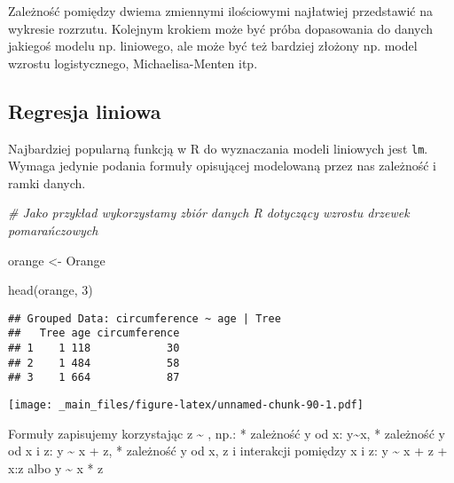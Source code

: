 \documentclass[
]{book}
\newenvironment{Shaded}{\begin{snugshade}}{\end{snugshade}}
\newcommand{\AttributeTok}[1]{\textcolor[rgb]{0.77,0.63,0.00}{#1}}
\newcommand{\CommentTok}[1]{\textcolor[rgb]{0.56,0.35,0.01}{\textit{#1}}}
\newcommand{\DecValTok}[1]{\textcolor[rgb]{0.00,0.00,0.81}{#1}}
\newcommand{\FunctionTok}[1]{\textcolor[rgb]{0.00,0.00,0.00}{#1}}
\newcommand{\NormalTok}[1]{#1}
\newcommand{\OtherTok}[1]{\textcolor[rgb]{0.56,0.35,0.01}{#1}}
\newcommand{\SpecialCharTok}[1]{\textcolor[rgb]{0.00,0.00,0.00}{#1}}
\begin{document}
Zależność pomiędzy dwiema zmiennymi ilościowymi najłatwiej przedstawić na wykresie rozrzutu. Kolejnym krokiem może być próba dopasowania do danych jakiegoś modelu np. liniowego, ale może być też bardziej złożony np. model wzrostu logistycznego, Michaelisa-Menten itp.

\hypertarget{regresja-liniowa}{%
\subsection{Regresja liniowa}\label{regresja-liniowa}}

Najbardziej popularną funkcją w R do wyznaczania modeli liniowych jest \texttt{lm}. Wymaga jedynie podania formuły opisującej modelowaną przez nas zależność i ramki danych.

\begin{Shaded}
\begin{Highlighting}[]
\CommentTok{\# Jako przykład wykorzystamy zbiór danych R dotyczący wzrostu drzewek pomarańczowych}

\NormalTok{orange }\OtherTok{\textless{}{-}}\NormalTok{ Orange}

\FunctionTok{head}\NormalTok{(orange, }\DecValTok{3}\NormalTok{)}
\end{Highlighting}
\end{Shaded}

\begin{verbatim}
## Grouped Data: circumference ~ age | Tree
##   Tree age circumference
## 1    1 118            30
## 2    1 484            58
## 3    1 664            87
\end{verbatim}

\begin{Shaded}
\end{Shaded}

\texttt{[image: \_main\_files/figure-latex/unnamed-chunk-90-1.pdf]}

Formuły zapisujemy korzystając z \textasciitilde{} , np.:
* zależność y od x: y\textasciitilde x,
* zależność y od x i z: y \textasciitilde{} x + z,
* zależność y od x, z i interakcji pomiędzy x i z: y \textasciitilde{} x + z + x:z albo y \textasciitilde{} x * z

\begin{Shaded}
\end{Shaded}
\end{document}
